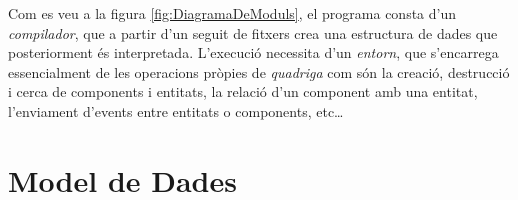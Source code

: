Com es veu a la figura \ref{fig:DiagramaDeModuls}, el programa consta d'un {\em compilador}, que a partir d'un seguit de fitxers crea una estructura de dades que posteriorment és interpretada. L'execució necessita d'un {\em entorn}, que s'encarrega essencialment de les operacions pròpies de {\em quadriga} com són la creació, destrucció i cerca de components i entitats, la relació d'un component amb una entitat, l'enviament d'events entre entitats o components, etc\ldots

\section{Model de Dades}